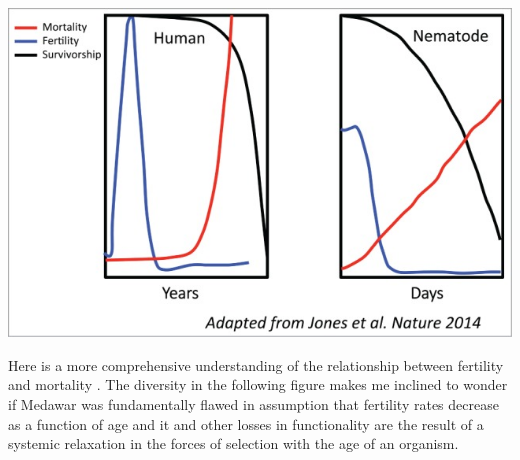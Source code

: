 \documentclass[]{book}
\newenvironment{Shaded}{\begin{snugshade}}{\end{snugshade}}
\newcommand{\DataTypeTok}[1]{\textcolor[rgb]{0.13,0.29,0.53}{#1}}
\newcommand{\DecValTok}[1]{\textcolor[rgb]{0.00,0.00,0.81}{#1}}
\newcommand{\KeywordTok}[1]{\textcolor[rgb]{0.13,0.29,0.53}{\textbf{#1}}}
\newcommand{\NormalTok}[1]{#1}
\newcommand{\OperatorTok}[1]{\textcolor[rgb]{0.81,0.36,0.00}{\textbf{#1}}}
\newcommand{\OtherTok}[1]{\textcolor[rgb]{0.56,0.35,0.01}{#1}}
\newcommand{\StringTok}[1]{\textcolor[rgb]{0.31,0.60,0.02}{#1}}
\begin{document}
\includegraphics{images/04-6.jpg}

Here is a more comprehensive understanding of the relationship between fertility and mortality \citep{jones2014diversity}. The diversity in the following figure makes me inclined to wonder if Medawar was fundamentally flawed in assumption that fertility rates decrease as a function of age and it and other losses in functionality are the result of a systemic relaxation in the forces of selection with the age of an organism.

\begin{Shaded}
\end{Shaded}
\end{document}
